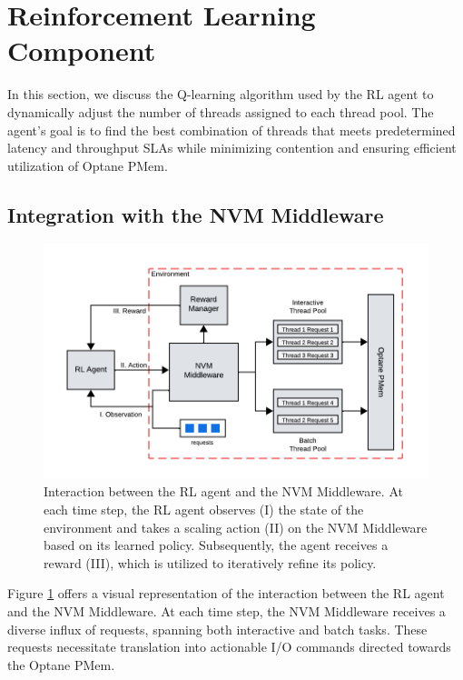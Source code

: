 \section{Reinforcement Learning Component}

In this section, we discuss the Q-learning algorithm used by the RL agent to dynamically adjust the number of threads assigned to each thread pool. The agent’s goal is to find the best combination of threads that meets predetermined latency and throughput SLAs while minimizing contention and ensuring efficient utilization of Optane PMem. 

\subsection{Integration with the NVM Middleware}

\begin{figure}[ht]
  \centering
  \includegraphics[scale=1]{images/rl_workflow.png}
  \caption[Interaction between Reinforcement Learning Agent and NVM Middleware]{Interaction between the RL agent and the NVM Middleware. At each time step, the RL agent observes (I) the state of the environment and takes a scaling action (II) on the NVM Middleware based on its learned policy. Subsequently, the agent receives a reward (III), which is utilized to iteratively refine its policy.}
  \label{fig:rl_workflow}
\end{figure}

Figure \ref{fig:rl_workflow} offers a visual representation of the interaction between the RL agent and the NVM Middleware. At each time step, the NVM Middleware receives a diverse influx of requests, spanning both interactive and batch tasks. These requests necessitate translation into actionable I/O commands directed towards the Optane PMem.

